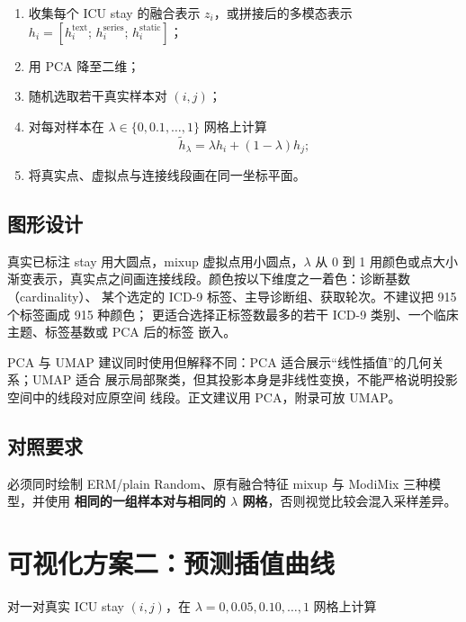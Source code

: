 \documentclass[11pt,a4paper]{article}
\theoremstyle{definition}
\begin{document}
\begin{enumerate}[itemsep=1pt]
  \item 收集每个 ICU stay 的融合表示 $z_i$，或拼接后的多模态表示
        $h_i=[h_i^{\text{text}};\,h_i^{\text{series}};\,h_i^{\text{static}}]$；
  \item 用 PCA 降至二维；
  \item 随机选取若干真实样本对 $(i,j)$；
  \item 对每对样本在 $\lambda\in\{0,0.1,\ldots,1\}$ 网格上计算
        \begin{equation}
          \tilde{h}_\lambda=\lambda h_i+(1-\lambda)h_j;
          \label{eq:interp-path}
        \end{equation}
  \item 将真实点、虚拟点与连接线段画在同一坐标平面。
\end{enumerate}

\subsection{图形设计}

真实已标注 stay 用大圆点，mixup 虚拟点用小圆点，$\lambda$ 从 0 到 1 用颜色或点大小
渐变表示，真实点之间画连接线段。颜色按以下维度之一着色：诊断基数（cardinality）、
某个选定的 ICD-9 标签、主导诊断组、获取轮次。不建议把 915 个标签画成 915 种颜色；
更适合选择正标签数最多的若干 ICD-9 类别、一个临床主题、标签基数或 PCA 后的标签
嵌入。

PCA 与 UMAP 建议同时使用但解释不同：PCA 适合展示“线性插值”的几何关系；UMAP 适合
展示局部聚类，但其投影本身是非线性变换，不能严格说明投影空间中的线段对应原空间
线段。正文建议用 PCA，附录可放 UMAP。

\subsection{对照要求}

必须同时绘制 ERM/plain Random、原有融合特征 mixup 与 ModiMix 三种模型，并使用
\textbf{相同的一组样本对与相同的 $\lambda$ 网格}，否则视觉比较会混入采样差异。

\section{可视化方案二：预测插值曲线}
\label{sec:vis-prediction}

对一对真实 ICU stay $(i,j)$，在 $\lambda=0,0.05,0.10,\ldots,1$ 网格上计算
\end{document}
